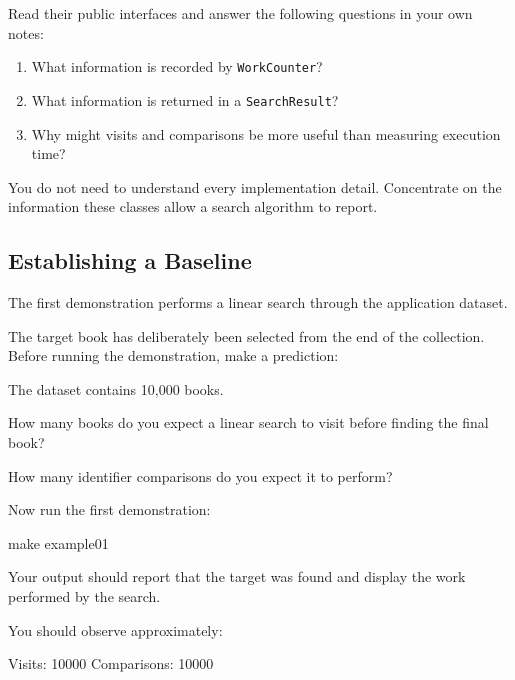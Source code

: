 \documentclass{csc2059practical}
\begin{document}
Read their public interfaces and answer the following questions in your own
notes:

\begin{enumerate}
    \item What information is recorded by \texttt{WorkCounter}?
    \item What information is returned in a \texttt{SearchResult}?
    \item Why might visits and comparisons be more useful than measuring
          execution time?
\end{enumerate}

You do not need to understand every implementation detail. Concentrate on the
information these classes allow a search algorithm to report.


\subsection{Establishing a Baseline}

The first demonstration performs a linear search through the application dataset.

The target book has deliberately been selected from the end of the collection.
Before running the demonstration, make a prediction:

\begin{reflectionbox}
The dataset contains 10,000 books.

How many books do you expect a linear search to visit before finding the final
book?

How many identifier comparisons do you expect it to perform?
\end{reflectionbox}

Now run the first demonstration:

\begin{terminal}
make example01
\end{terminal}

Your output should report that the target was found and display the work
performed by the search.

You should observe approximately:

\begin{terminal}
Visits: 10000
Comparisons: 10000
\end{terminal}
\end{document}

